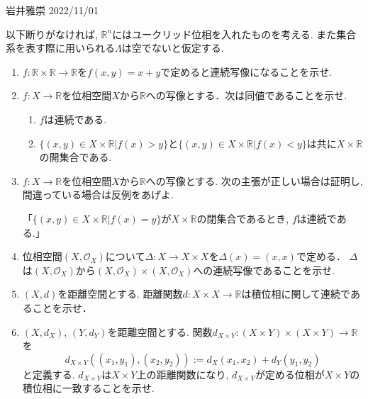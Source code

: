 \documentclass[dvipdfmx,a4paper,11pt]{article}
\newcommand{\R}{\mathbb{R}}
\theoremstyle{definition}
\begin{document}
\begin{flushright}
 岩井雅崇 2022/11/01
\end{flushright}
以下断りがなければ, $\R^{n}$にはユークリッド位相を入れたものを考える. また集合系を表す際に用いられる$\Lambda$は空でないと仮定する. 
\begin{enumerate}[ label=\textbf{問}5.\arabic*]

\item $f : \R \times \R \rightarrow \R$を$f(x,y)=x+y$で定めると連続写像になることを示せ.
\item  $f : X \rightarrow \R$を位相空間$X$から$\R$への写像とする．次は同値であることを示せ.
	\begin{enumerate}
	\item $f$は連続である.
	\item $\{ (x,y) \in X \times \R | f(x) >y\}$と$\{ (x,y) \in X \times \R | f(x) <y\}$は共に$X \times \R$の開集合である. 
	\end{enumerate}
\item  $f : X \rightarrow \R$を位相空間$X$から$\R$への写像とする. 次の主張が正しい場合は証明し, 間違っている場合は反例をあげよ.

「$\{ (x,y) \in X \times \R | f(x) =y\}$が$X \times \R$の閉集合であるとき, $f$は連続である.」

\item 位相空間$(X, \mathscr{O}_X )$について$\Delta : X \rightarrow X \times X$を$\Delta(x)=(x,x)$で定める．
$\Delta$は$(X, \mathscr{O}_X )$から$(X, \mathscr{O}_X )\times (X, \mathscr{O}_X )$への連続写像であることを示せ.

\item $(X,d)$を距離空間とする. 距離関数$d : X \times X \rightarrow \R$は積位相に関して連続であることを示せ．
\item $(X,d_X)$, $(Y,d_Y)$を距離空間とする. 関数$d_{X \times Y} : (X \times Y)\times (X \times Y) \rightarrow \R$を
$$
d_{X \times Y} ( (x_1, y_1) ,  (x_2, y_2)) :=  d_X (x_1, x_2) + d_Y(y_1, y_2)
$$
と定義する. $d_{X \times Y} $は$X \times Y$上の距離関数になり,  $d_{X \times Y} $が定める位相が$X \times Y$の積位相に一致することを示せ. 




\end{enumerate}
\end{document}
